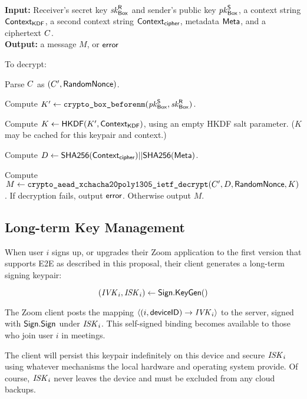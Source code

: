 
{\underline {\bf \cboxdecrypt}} \\
{\bf Input:} Receiver's secret key $\mathit{sk}_{{\sf Box}}^{\sf R}$ and sender's public key $\mathit{pk}_{{\sf Box}}^{\sf S}$, a context string ${\sf Context}_\textsf{KDF}$, a second context string ${\sf Context}_\textsf{cipher}$, metadata ${\sf Meta}$, and a ciphertext $C$. \\
{\bf Output:} a message $M$, or ${\sf error}$

To decrypt:

\vspace{-1em}
\begingroup
\RaggedRight
\begin{enumerate*}
\item Parse $C$ as $(C', {\sf RandomNonce})$.
\item Compute $K' \leftarrow \texttt{crypto\_box\_beforenm}(\mathit{pk}_{{\sf Box}}^{\sf S}, \mathit{sk}_{{\sf Box}}^{\sf R})$.
\item Compute $K \leftarrow {\sf HKDF}(K', {\sf Context}_\textsf{KDF})$, using an empty HKDF salt parameter. ($K$ may be cached for this keypair and context.)
\item Compute $D \leftarrow {\sf SHA256}({\sf Context}_\textsf{cipher}) || {\sf SHA256}({\sf Meta})$.
\item Compute $M \leftarrow \texttt{crypto\_aead\_xchacha20poly1305\_ietf\_decrypt}(C', D, {\sf RandomNonce}, K)$. If decryption fails, output ${\sf error}$. Otherwise output $M$.
\end{enumerate*}
\endgroup

\subsection{Long-term Key Management}
\label{sec:keymanage}

When user $i$ signs up, or upgrades their Zoom application to the first version that supports E2E as described in this proposal, their client generates a long-term signing keypair:

\[
(\mathit{IVK}_i, \mathit{ISK}_i) \leftarrow {\sf Sign}.\mathsf{KeyGen}()
\]

The Zoom client posts the mapping $\langle (i, {\sf deviceID}) \rightarrow \mathit{IVK}_i \rangle$ to the server, signed with ${\sf Sign}.\mathsf{Sign}$ under $\mathit{ISK}_i$. This self-signed binding becomes available to those who join user $i$ in meetings.

The client will persist this keypair indefinitely on this device and secure $\mathit{ISK}_i$ using whatever mechanisms the local hardware and operating system provide. Of course, $\mathit{ISK}_i$ never leaves the device and must be excluded from any cloud backups.

